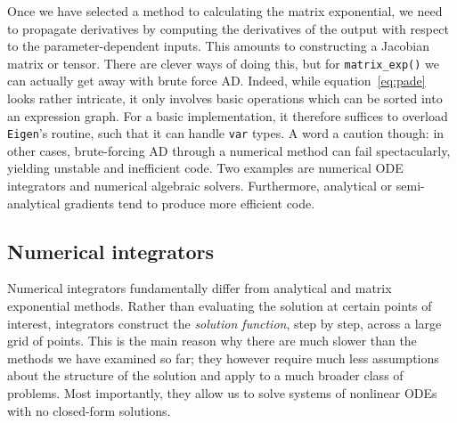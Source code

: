\documentclass[11pt]{article}
\begin{document}
Once we have selected a method to calculating the matrix exponential,
we need to propagate derivatives by computing the derivatives of the output with respect to
the parameter-dependent inputs. This amounts to constructing a Jacobian matrix or tensor.
There are clever ways of doing this, but for \texttt{matrix\_exp()} we can actually get away
with brute force AD.
Indeed, while equation~\ref{eq:pade} looks rather intricate, it only involves basic operations
which can be sorted into an expression graph.
For a basic implementation, it therefore suffices to overload \texttt{Eigen}'s routine, such that
it can handle \texttt{var} types.
A word a caution though: in other cases, brute-forcing AD through a numerical method can
fail spectacularly, yielding unstable and inefficient code.
Two examples are numerical ODE integrators and numerical algebraic solvers.
Furthermore, analytical or semi-analytical gradients tend to produce more efficient code.

%
%

\subsection{Numerical integrators}

Numerical integrators fundamentally differ from analytical and matrix exponential methods.
Rather than evaluating the solution at certain points of interest,
integrators construct the \textit{solution function}, step by step, across a large grid of points.
This is the main reason why there are much slower than the methods we have examined so far;
they however require much less assumptions about the structure of the solution and apply to a much
broader class of problems. Most importantly, they allow us to solve systems of nonlinear ODEs with
no closed-form solutions.
\end{document}
